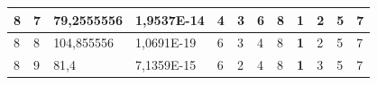 \documentclass[conference]{IEEEtran}
\begin{document}
\begin{table}[]
\begin{tabular}{|llll|llllllll|}
\multicolumn{1}{|l|}{8}                                                     & \multicolumn{1}{l|}{7}                                                        & \multicolumn{1}{l|}{79,2555556}                                                   & 1,9537E-14                     & \multicolumn{1}{l|}{4}                                                  & \multicolumn{1}{l|}{3}                                                  & \multicolumn{1}{l|}{6}                                                  & \multicolumn{1}{l|}{8}                                                  & \multicolumn{1}{l|}{\textbf{1}}                                         & \multicolumn{1}{l|}{2}                                                  & \multicolumn{1}{l|}{5}                                                  & 7                          \\ \hline
\multicolumn{1}{|l|}{8}                                                     & \multicolumn{1}{l|}{8}                                                        & \multicolumn{1}{l|}{104,855556}                                                   & 1,0691E-19                     & \multicolumn{1}{l|}{6}                                                  & \multicolumn{1}{l|}{3}                                                  & \multicolumn{1}{l|}{4}                                                  & \multicolumn{1}{l|}{8}                                                  & \multicolumn{1}{l|}{\textbf{1}}                                         & \multicolumn{1}{l|}{2}                                                  & \multicolumn{1}{l|}{5}                                                  & 7                          \\ \hline
\multicolumn{1}{|l|}{8}                                                     & \multicolumn{1}{l|}{9}                                                        & \multicolumn{1}{l|}{81,4}                                                         & 7,1359E-15                     & \multicolumn{1}{l|}{6}                                                  & \multicolumn{1}{l|}{2}                                                  & \multicolumn{1}{l|}{4}                                                  & \multicolumn{1}{l|}{8}                                                  & \multicolumn{1}{l|}{\textbf{1}}                                         & \multicolumn{1}{l|}{3}                                                  & \multicolumn{1}{l|}{5}                                                  & 7                          \\ \hline

\end{tabular}
\end{table}
\end{document}

